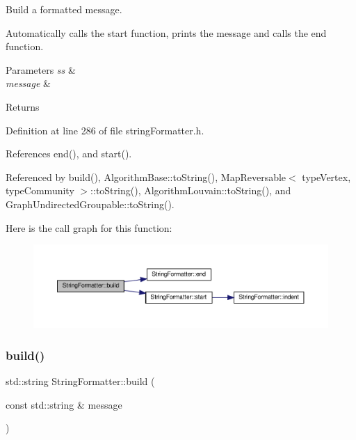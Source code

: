 Build a formatted message. 

Automatically calls the start function, prints the message and calls the end function.


\begin{DoxyParams}{Parameters}
{\em ss} & \\
\hline
{\em message} & \\
\hline
\end{DoxyParams}
\begin{DoxyReturn}{Returns}

\end{DoxyReturn}


Definition at line 286 of file string\+Formatter.\+h.



References end(), and start().



Referenced by build(), Algorithm\+Base\+::to\+String(), Map\+Reversable$<$ type\+Vertex, type\+Community $>$\+::to\+String(), Algorithm\+Louvain\+::to\+String(), and Graph\+Undirected\+Groupable\+::to\+String().

Here is the call graph for this function\+:
\nopagebreak
\begin{figure}[H]
\begin{center}
\leavevmode
\includegraphics[width=350pt]{classStringFormatter_af7fd3924f4db714c3b278ffa3c26a872_cgraph}
\end{center}
\end{figure}
\mbox{\label{classStringFormatter_a49080dfd01d9fbca9efab8a8a955ab76}} 
\subsubsection{\texorpdfstring{build()}{build()}\hspace{0.1cm}{\footnotesize\ttfamily [2/2]}}
{\footnotesize\ttfamily std\+::string String\+Formatter\+::build (\begin{DoxyParamCaption}\item[{const std\+::string \&}]{message }\end{DoxyParamCaption})\hspace{0.3cm}{\ttfamily [inline]}}



